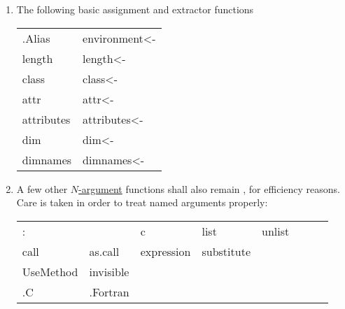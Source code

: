 \begin{enumerate}
\item The following basic assignment and extractor functions
  \begin{center}\ttfamily
    \begin{tabular}{ll}
      .Alias & environment<- \\
      length & length<- \\
      class  & class<-  \\
        attr & attr<- \\
   attributes& attributes<- \\
      dim    & dim<- \\
    dimnames & dimnames<- \\
    \end{tabular}
  \end{center}

\item A few other \underline{$N$-argument} functions shall also remain
  \primfun, for efficiency reasons.
  Care is taken in order to treat named arguments properly:
  \begin{center}\ttfamily
    \renewcommand{\~}{\code{\char'176}}
    \begin{tabular}{*{8}{l}}
      :    & \~ & c & list & unlist \\
      call & as.call & expression & substitute \\
      UseMethod & invisible \\
      .C & .Fortran
    \end{tabular}
  \end{center}

\end{enumerate}
